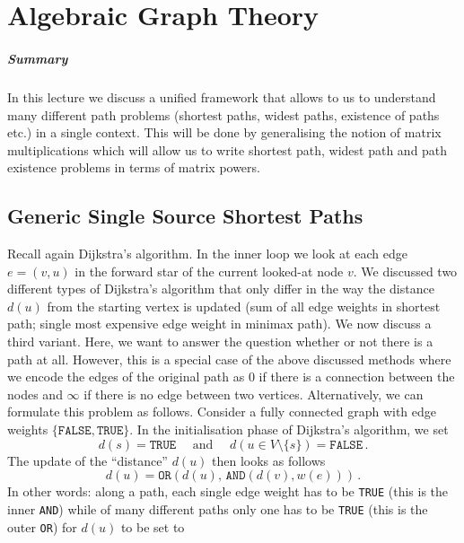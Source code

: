 \chapter{Algebraic Graph Theory}%
\label{chap:09}

\paragraph*{Summary} In this lecture we discuss a unified framework that allows
to us to understand many different path problems (shortest paths, widest paths,
existence of paths etc.) in a single context. This will be done by generalising
the notion of matrix multiplications which will allow us to write shortest path,
widest path and path existence problems in terms of matrix powers.

\section{Generic Single Source Shortest Paths}
Recall again Dijkstra's algorithm. In the inner loop we look at each edge
$e = (v,u)$ in the forward star of the current looked-at node $v$. We discussed
two different types of Dijkstra's algorithm that only differ in the way the
distance $d(u)$ from the starting vertex is updated (sum of all edge weights in
shortest path; single most expensive edge weight in minimax path). We now
discuss a third variant.  Here, we want to answer the question whether or not
there is a path at all. However, this is a special case of the above discussed
methods where we encode the edges of the original path as $0$ if there is a
connection between the nodes and $\infty$ if there is no edge between two
vertices. Alternatively, we can formulate this problem as follows. Consider a
fully connected graph with edge weights $\{\mathtt{FALSE},\mathtt{TRUE}\}$. In
the initialisation phase of Dijkstra's algorithm, we set
\begin{equation*}
  d(s) = \mathtt{TRUE} \quad \text{ and } \quad d(u \in V \setminus \{s\}) = \mathtt{FALSE}\,.
\end{equation*}
The update of the ``distance'' $d(u)$ then looks as follows
\begin{equation*}
  d(u) = \mathtt{OR}(d(u),\, \mathtt{AND}(d(v), w(e)))\,.
\end{equation*}
In other words: along a path, each single edge weight has to be \texttt{TRUE}
(this is the inner \texttt{AND}) while of many different paths only one has to
be \texttt{TRUE} (this is the outer \texttt{OR}) for $d(u)$ to be set to

